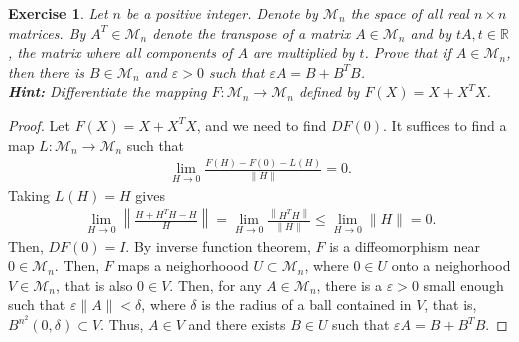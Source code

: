 \documentclass[11pt]{article}
\newtheorem{exercise}{Exercise}[section]
\theoremstyle{definition}
\numberwithin{equation}{subsection}
\begin{document}
\medskip

\begin{exercise}{\rm *}
Let $n$ be a positive integer. Denote by $\mathcal{M}_n$ the space of all real $n \times n$ matrices. By $A^T \in \mathcal{M}_n$ denote the transpose of a matrix $A \in \mathcal{M}_n$ and by $tA, t \in \mathbb{R}$, the matrix where all components of $A$ are multiplied by $t$. Prove that if $A \in \mathcal{M}_n$, then there is $B \in \mathcal{M}_n$ and $\varepsilon > 0$ such that $\varepsilon A = B + B^T B$.\\
{\bf Hint:} Differentiate the mapping $F: \mathcal{M}_n \to \mathcal{M}_n$ defined by $F(X) = X + X^TX$.
\end{exercise}
\begin{proof}
Let $F(X) = X + X^TX$, and we need to find $DF(0)$. It suffices to find a map $L:\mathcal{M}_n \to \mathcal{M}_n$ such that
\begin{align*}
    \lim_{H \to 0} \frac{F(H) - F(0) - L(H)}{\|H\|} = 0.
\end{align*}
Taking $L(H) = H$ gives
\begin{align*}
    \lim_{H \to 0} \left\|\frac{H + H^TH - H}{H}\right\| = \lim_{H \to 0} \frac{\left\|H^TH \right\|}{\|H\|} \leq \lim_{H \to 0} \|H\| = 0.
\end{align*}
Then, $DF(0) = I$. By inverse function theorem, $F$ is a diffeomorphism near $0 \in \mathcal{M}_n$. Then, $F$ maps a neighorhoood $U \subset \mathcal{M}_n$, where $0 \in U$ onto a neighorhood $V \in \mathcal{M}_n$, that is also $0 \in V$. Then, for any $A \in \mathcal{M}_n$, there is a $\varepsilon > 0$ small enough such that $\varepsilon \|A\| < \delta$, where $\delta$ is the radius of a ball contained in $V$, that is, $B^{n^2}(0,\delta) \subset V$. Thus, $A \in V$ and there exists $B \in U$ such that $\varepsilon A = B + B^T B$.
\end{proof}

\medskip
\end{document}
